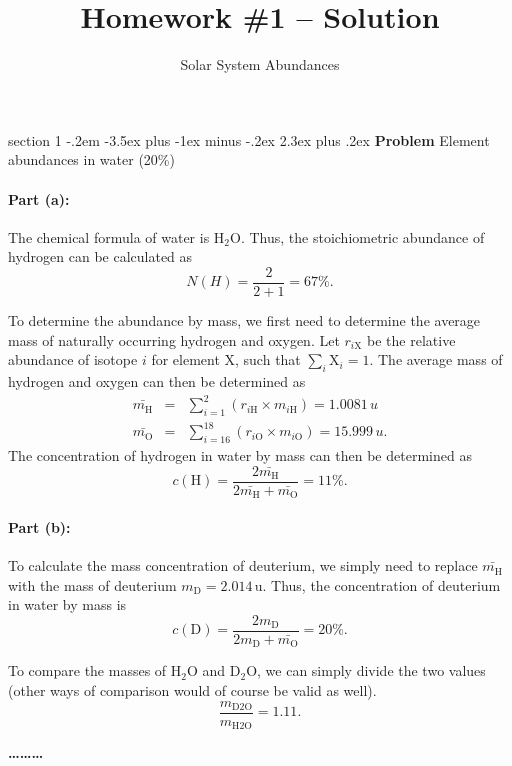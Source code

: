 \documentclass[letterpaper,12pt,twoside=false,DIV=13]{scrartcl}
\makeatletter
\newcommand{\topic}{\author}
\newenvironment{problem}{\@startsection
    {section}
    {1}
    {-.2em}
    {-3.5ex plus -1ex minus -.2ex}
    {2.3ex plus .2ex}
    {
        \pagebreak[3] %
        \noindent\sffamily\bfseries Problem
    }
}
{
    \begin{center}\large\bfseries\ldots\ldots\ldots\end{center}
}
\makeatother
\begin{document}
\title{Homework \#1 -- Solution}
\topic{Solar System Abundances}

\maketitle
\thispagestyle{fancy}


\begin{problem}{Element abundances in water (20\%)}

\paragraph{Part (a):}The chemical formula of water is H$_2$O. Thus, the stoichiometric abundance of hydrogen can be calculated as
\begin{equation}
    N(H) = \frac{2}{2+1} = 67\%.
\end{equation}

To determine the abundance by mass, we first need to determine the average mass of naturally occurring hydrogen and oxygen. Let $r_{i\mathrm{X}}$ be the relative abundance of isotope $i$ for element X, such that $\sum_i \mathrm{X}_i = 1$. The average mass of hydrogen and oxygen can then be determined as
\begin{eqnarray}
    \bar{m_\mathrm{H}} &=& \sum_{i=1}^{2}\left(r_{i\mathrm{H}} \times m_{i\mathrm{H}}\right) = 1.0081\,u \\
    \bar{m_\mathrm{O}} &=& \sum_{i=16}^{18}\left(r_{i\mathrm{O}} \times m_{i\mathrm{O}}\right) = 15.999\,u .
\end{eqnarray}
The concentration of hydrogen in water by mass can then be determined as
\begin{equation}
    c(\mathrm{H}) = \frac{2 \bar{m_\mathrm{H}}}{2 \bar{m_\mathrm{H}} + \bar{m_\mathrm{O}}} = 11\%.
\end{equation}

\paragraph{Part (b):} To calculate the mass concentration of deuterium, we simply need to replace $\bar{m_\mathrm{H}}$ with the mass of deuterium $m_\mathrm{D} = 2.014$\,u. Thus, the concentration of deuterium in water by mass is
\begin{equation}
        c(\mathrm{D}) = \frac{2 {m_\mathrm{D}}}{2 {m_\mathrm{D}} + \bar{m_\mathrm{O}}} = 20\%.
\end{equation}

To compare the masses of H$_2$O and D$_2$O, we can simply divide the two values (other ways of comparison would of course be valid as well).
\begin{equation}
    \frac{m_\mathrm{D2O}}{m_\mathrm{H2O}} = 1.11.
\end{equation}
    
\end{problem}
\end{document}
